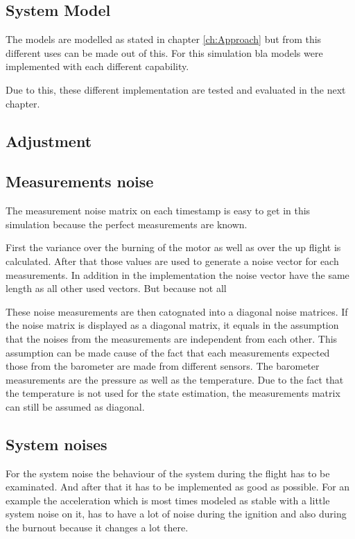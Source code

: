 \subsection{System Model}
The models are modelled as stated in chapter \ref{ch:Approach} but from this different uses can be made out of this.
For this simulation bla models were implemented with each different capability.

Due to this, these different implementation are tested and evaluated in the next chapter.
\subsection{Adjustment}

\subsection{Measurements noise}
The measurement noise matrix on each timestamp is easy to get in this simulation because the perfect measurements are known.

First the variance over the burning of the motor as well as over the up flight is calculated.
After that those values are used to generate a noise vector for each measurements.
In addition in the implementation the noise vector have the same length as all other used vectors.
But because not all 

These noise measurements are then catognated into a diagonal noise matrices.
If the noise matrix is displayed as a diagonal matrix, 
it equals in the assumption that the noises from the measurements are independent from each other.
This assumption can be made cause of the fact that each measurements expected those from the barometer are made from different sensors.
The barometer measurements are the pressure as well as the temperature.
Due to the fact that the temperature is not used for the state estimation, the measurements matrix can still be assumed as diagonal.



\subsection{System noises}
For the system noise the behaviour of the system during the flight has to be examinated.
And after that it has to be implemented as good as possible.
For an example the acceleration which is most times modeled as stable with a little system noise on it,
has to have a lot of noise during the ignition and also during the burnout because it changes a lot there.

